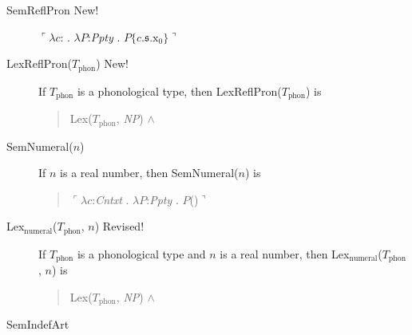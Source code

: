 \begin{description}
\item[\textnormal{SemReflPron} New!] \mbox{}

  $\ulcorner\lambda c$: . $\lambda
  P$:\textit{Ppty} . $P\{c.\mathfrak{s}.\text{x}_0\}\urcorner$

\item[\textnormal{LexReflPron($T_{\text{phon}}$)} New!] \mbox{}

If $T_{\text{phon}}$ is a phonological type, then
LexReflPron($T_{\text{phon}}$) is
\begin{quote}
Lex($T_{\mathrm{phon}}$, \textit{NP}) \d{$\wedge$}
\end{quote}


\item[\textnormal{SemNumeral($n$)}] \mbox{}

  If $n$ is a real number, then SemNumeral($n$) is
  \begin{quote}
    $\ulcorner\lambda c$:\textit{Cntxt} . $\lambda P$:\textit{Ppty}
    . $P$()$\urcorner$
  \end{quote}

  
\item[\textnormal{Lex$_{\mathrm{numeral}}$($T_{\mathrm{phon}}$, $n$)} Revised!] \mbox{}

    If $T_{\mathrm{phon}}$ is a phonological type and $n$ is a real
    number, then Lex$_{\mathrm{numeral}}$($T_{\mathrm{phon}}$, $n$) is
    \begin{quote}
      Lex($T_{\mathrm{phon}}$, \textit{NP}) \d{$\wedge$}
    \end{quote}
    

  
\item[\textnormal{SemIndefArt}] \mbox{}



\end{description}
